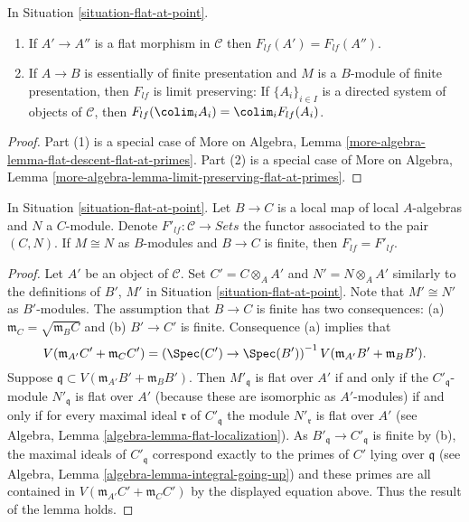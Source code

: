 \begin{lemma}
\label{lemma-flat-at-point}
In Situation \ref{situation-flat-at-point}.
\begin{enumerate}
\item If $A' \to A''$ is a flat morphism in $\mathcal{C}$
then $F_{lf}(A') = F_{lf}(A'')$.
\item If $A \to B$ is essentially of finite presentation and
$M$ is a $B$-module of finite presentation, then $F_{lf}$ is limit
preserving: If $\{A_i\}_{i \in I}$ is a
directed system of objects of $\mathcal{C}$, then
$F_{lf}(\colim_i A_i) = \colim_i F_{lf}(A_i)$.
\end{enumerate}
\end{lemma}

\begin{proof}
Part (1) is a special case of
More on Algebra,
Lemma \ref{more-algebra-lemma-flat-descent-flat-at-primes}.
Part (2) is a special case of
More on Algebra,
Lemma \ref{more-algebra-lemma-limit-preserving-flat-at-primes}.
\end{proof}

\begin{lemma}
\label{lemma-flat-at-point-finite}
In Situation \ref{situation-flat-at-point}. Let $B \to C$ is a local map of
local $A$-algebras and $N$ a $C$-module. Denote
$F'_{lf} : \mathcal{C} \to \textit{Sets}$ the functor associated to the pair
$(C, N)$. If $M \cong N$ as $B$-modules and $B \to C$ is finite, then
$F_{lf} = F'_{lf}$.
\end{lemma}

\begin{proof}
Let $A'$ be an object of $\mathcal{C}$. Set $C' = C \otimes_A A'$
and $N' = N \otimes_A A'$ similarly to the definitions of $B'$, $M'$ in
Situation \ref{situation-flat-at-point}.
Note that $M' \cong N'$ as $B'$-modules.
The assumption that $B \to C$ is finite has two consequences:
(a) $\mathfrak m_C = \sqrt{\mathfrak m_B C}$ and (b)
$B' \to C'$ is finite. Consequence (a) implies that
$$
V(\mathfrak m_{A'}C' + \mathfrak m_C C')
=
\left(
\Spec(C') \to \Spec(B')
\right)^{-1}V(\mathfrak m_{A'}B' + \mathfrak m_B B').
$$
Suppose $\mathfrak q \subset V(\mathfrak m_{A'}B' + \mathfrak m_B B')$.
Then $M'_{\mathfrak q}$ is flat over $A'$ if and only if
the $C'_{\mathfrak q}$-module $N'_{\mathfrak q}$ is flat over $A'$
(because these are isomorphic as $A'$-modules) if and only if
for every maximal ideal $\mathfrak r$ of $C'_{\mathfrak q}$
the module $N'_{\mathfrak r}$ is flat over $A'$ (see
Algebra, Lemma \ref{algebra-lemma-flat-localization}).
As $B'_{\mathfrak q} \to C'_{\mathfrak q}$ is finite by (b),
the maximal ideals of $C'_{\mathfrak q}$ correspond exactly
to the primes of $C'$ lying over $\mathfrak q$ (see
Algebra, Lemma \ref{algebra-lemma-integral-going-up})
and these primes are all contained in
$V(\mathfrak m_{A'}C' + \mathfrak m_C C')$ by
the displayed equation above. Thus the result of the lemma holds.
\end{proof}

